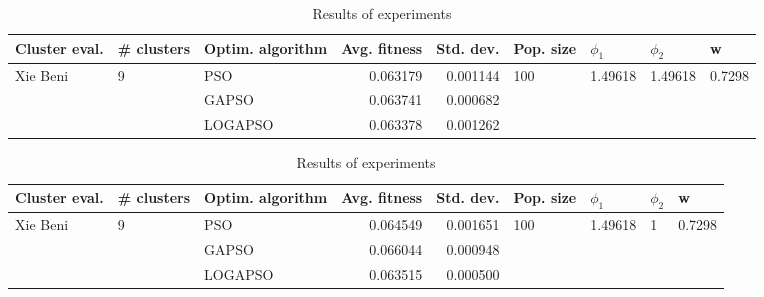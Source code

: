 \documentclass{article}
\begin{document}
\begin{table}
\centering
\caption{Results of experiments}
\begin{tabular}{lllrrllll}
\toprule
            Cluster eval. &        \# clusters & Optim. algorithm &  Avg. fitness &  Std. dev. &            Pop. size &               $\phi_{1}$ &               $\phi_{2}$ &                       w \\
\midrule
\multirow{3}{*}{Xie Beni} & \multirow{3}{*}{9} &              PSO &      0.063179 &   0.001144 & \multirow{3}{*}{100} & \multirow{3}{*}{1.49618} & \multirow{3}{*}{1.49618} & \multirow{3}{*}{0.7298} \\
                          &                    &            GAPSO &      0.063741 &   0.000682 &                      &                          &                          &                         \\
                          &                    &          LOGAPSO &      0.063378 &   0.001262 &                      &                          &                          &                         \\
\bottomrule
\end{tabular}
\end{table}
\begin{table}
\centering
\caption{Results of experiments}
\begin{tabular}{lllrrllll}
\toprule
            Cluster eval. &        \# clusters & Optim. algorithm &  Avg. fitness &  Std. dev. &            Pop. size &               $\phi_{1}$ &         $\phi_{2}$ &                       w \\
\midrule
\multirow{3}{*}{Xie Beni} & \multirow{3}{*}{9} &              PSO &      0.064549 &   0.001651 & \multirow{3}{*}{100} & \multirow{3}{*}{1.49618} & \multirow{3}{*}{1} & \multirow{3}{*}{0.7298} \\
                          &                    &            GAPSO &      0.066044 &   0.000948 &                      &                          &                    &                         \\
                          &                    &          LOGAPSO &      0.063515 &   0.000500 &                      &                          &                    &                         \\
\bottomrule
\end{tabular}
\end{table}
\end{document}
